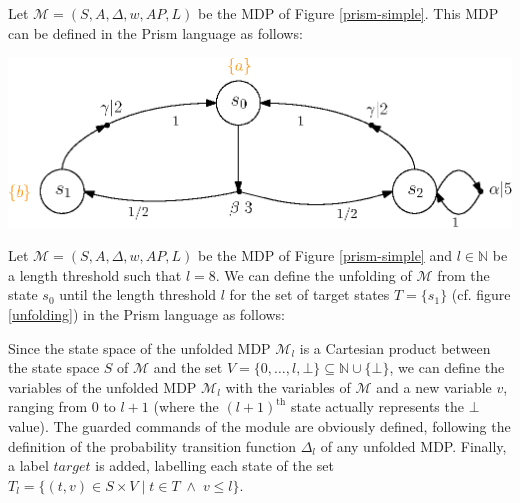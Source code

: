 \begin{example}
Let $\mathcal{M}=(S, A, \Delta, w, AP, L)$ be the MDP of Figure \ref{prism-simple}. This MDP can be defined in the Prism language as follows:\\
\begin{minipage}{0.4\linewidth}
  
\end{minipage}
\begin{minipage}{0.6\linewidth}
    \includegraphics[width=\linewidth]{resources/simple-mdp}
    \captionsetup{justification=centering}
    \label{prism-simple}
\end{minipage}
\end{example}

\begin{example}
Let $\mathcal{M}=(S, A, \Delta, w, AP, L)$ be the MDP of Figure \ref{prism-simple} and $l \in \mathbb{N}$
be a length threshold such that $l=8$. We can define the unfolding of $\mathcal{M}$ from the state $s_0$ until the length threshold $l$ for the set of target states $T = \{s_1\}$ (cf. figure \ref{unfolding}) in the Prism language as follows:

\end{example}
Since the state space of the unfolded MDP $\mathcal{M}_l$ is a Cartesian product between the state space $S$ of $\mathcal{M}$ and the set $V = \{0, \dots, l, \bot\} \subseteq \mathbb{N} \cup \{\bot\}$, we can define the variables of the unfolded MDP $\mathcal{M}_l$ with the variables of $\mathcal{M}$ and a new variable $v$, ranging from $0$ to $l+1$ (where the $(l+1)^\text{th}$ state actually represents the $\bot$ value). The guarded
commands of the module are obviously defined, following the definition of the
probability transition function $\Delta_l$ of any unfolded MDP. Finally, a label $target$ is added,
labelling each state of the set $T_l = \{ (t, v) \in S \times V \; | \; t \in T \; \wedge \; v \leq l \}$.

